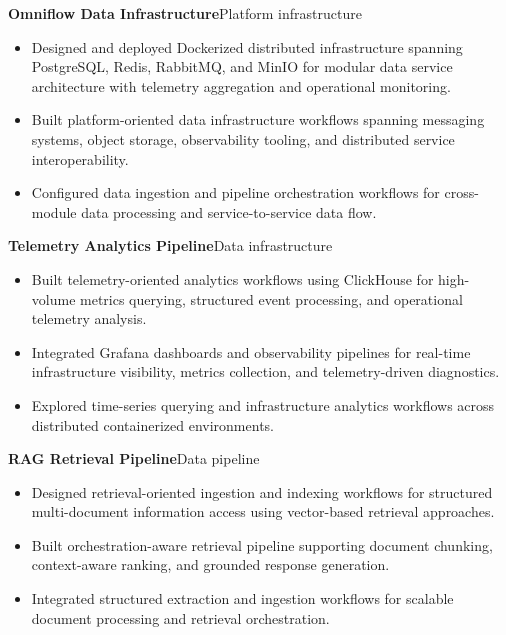
\textbf{Omniflow Data Infrastructure}\hfill {\color{SecondaryText}\small Platform infrastructure}\par
\begin{itemize}
  \item Designed and deployed Dockerized distributed infrastructure spanning PostgreSQL, Redis, RabbitMQ, and MinIO for modular data service architecture with telemetry aggregation and operational monitoring.
  \item Built platform-oriented data infrastructure workflows spanning messaging systems, object storage, observability tooling, and distributed service interoperability.
  \item Configured data ingestion and pipeline orchestration workflows for cross-module data processing and service-to-service data flow.
\end{itemize}

\newpage
\textbf{Telemetry Analytics Pipeline}\hfill {\color{SecondaryText}\small Data infrastructure}\par
\begin{itemize}
  \item Built telemetry-oriented analytics workflows using ClickHouse for high-volume metrics querying, structured event processing, and operational telemetry analysis.
  \item Integrated Grafana dashboards and observability pipelines for real-time infrastructure visibility, metrics collection, and telemetry-driven diagnostics.
  \item Explored time-series querying and infrastructure analytics workflows across distributed containerized environments.
\end{itemize}

\textbf{RAG Retrieval Pipeline}\hfill {\color{SecondaryText}\small Data pipeline}\par
\begin{itemize}
  \item Designed retrieval-oriented ingestion and indexing workflows for structured multi-document information access using vector-based retrieval approaches.
  \item Built orchestration-aware retrieval pipeline supporting document chunking, context-aware ranking, and grounded response generation.
  \item Integrated structured extraction and ingestion workflows for scalable document processing and retrieval orchestration.
\end{itemize}

